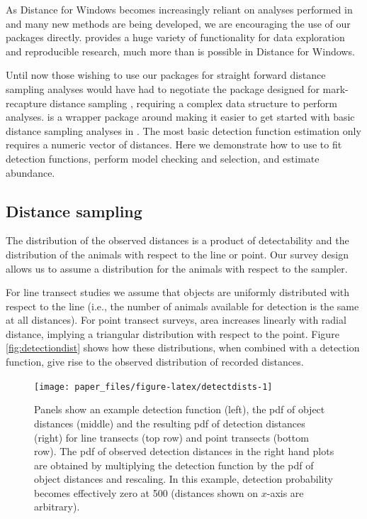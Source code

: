 \documentclass[article,shortnames]{jss}
\begin{document}
As Distance for Windows becomes increasingly reliant on analyses
performed in  and many new methods are being developed, we
are encouraging the use of our  packages directly.
 provides a huge variety of functionality for data
exploration and reproducible research, much more than is possible in
Distance for Windows.

Until now those wishing to use our  packages for straight
forward distance sampling analyses would have had to negotiate the
package  \citep{mrds-pkg} designed for mark-recapture distance
sampling \citep{Burt:2014gu}, requiring a complex data structure to
perform analyses.  is a wrapper package around 
making it easier to get started with basic distance sampling analyses in
. The most basic detection function estimation only requires
a numeric vector of distances. Here we demonstrate how to use
 to fit detection functions, perform model checking and
selection, and estimate abundance.

\subsection{Distance sampling}\label{distance-sampling}

The distribution of the observed distances is a product of detectability
\citep[sometimes referred to as ``perception bias'';][]{Marsh:1989ho}
and the distribution of the animals with respect to the line or point.
Our survey design allows us to assume a distribution for the animals
with respect to the sampler.

For line transect studies we assume that objects are uniformly
distributed with respect to the line (i.e., the number of animals
available for detection is the same at all distances). For point
transect surveys, area increases linearly with radial distance, implying
a triangular distribution with respect to the point. Figure
\ref{fig:detectiondist} shows how these distributions, when combined
with a detection function, give rise to the observed distribution of
recorded distances.

\begin{CodeChunk}
\begin{figure}

{\centering \texttt{[image: paper\_files/figure-latex/detectdists-1]} 

}

\caption{Panels show an example detection function (left), the pdf of object distances (middle) and the resulting pdf of detection distances (right) for line transects (top row) and point transects (bottom row). The pdf of observed detection distances in the right hand plots are obtained by multiplying the detection function by the pdf of object distances and rescaling. In this example, detection probability becomes effectively zero at 500 (distances shown on $x$-axis are arbitrary). \label{fig:detectiondist}}\label{fig:detectdists}
\end{figure}
\end{CodeChunk}
\end{document}
